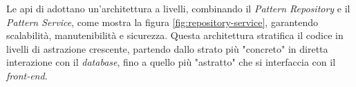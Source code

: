 Le \gls{api} di {\movi} adottano un'architettura a livelli, combinando il \textit{Pattern Repository} e il \textit{Pattern Service}, 
come mostra la figura \ref{fig:repository-service}, garantendo scalabilità, manutenibilità e sicurezza.
Questa architettura stratifica il codice in livelli di astrazione crescente, 
partendo dallo strato più "concreto" in diretta interazione con il \textit{database}, fino a quello più 
"astratto" che si interfaccia con il \textit{front-end}.